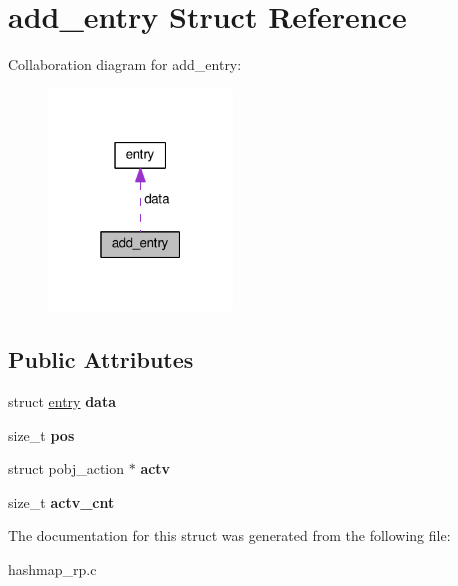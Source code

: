 \hypertarget{structadd__entry}{}\section{add\+\_\+entry Struct Reference}
\label{structadd__entry}


Collaboration diagram for add\+\_\+entry\+:\nopagebreak
\begin{figure}[H]
\begin{center}
\leavevmode
\includegraphics[width=139pt]{structadd__entry__coll__graph}
\end{center}
\end{figure}
\subsection*{Public Attributes}
\begin{DoxyCompactItemize}
\item 
struct \hyperlink{structentry}{entry} {\bfseries data}\hypertarget{structadd__entry_ada303ac47bbd298d31a08ff5fb0c8d48}{}\label{structadd__entry_ada303ac47bbd298d31a08ff5fb0c8d48}

\item 
size\+\_\+t {\bfseries pos}\hypertarget{structadd__entry_aff20888396f928a47207ec2fe432efe9}{}\label{structadd__entry_aff20888396f928a47207ec2fe432efe9}

\item 
struct pobj\+\_\+action $\ast$ {\bfseries actv}\hypertarget{structadd__entry_a02a8967aa6cd3e8bbbaa6c35571379a2}{}\label{structadd__entry_a02a8967aa6cd3e8bbbaa6c35571379a2}

\item 
size\+\_\+t {\bfseries actv\+\_\+cnt}\hypertarget{structadd__entry_a288eb722a38cd8a357d0600475defe70}{}\label{structadd__entry_a288eb722a38cd8a357d0600475defe70}

\end{DoxyCompactItemize}


The documentation for this struct was generated from the following file\+:\begin{DoxyCompactItemize}
\item 
hashmap\+\_\+rp.\+c\end{DoxyCompactItemize}
